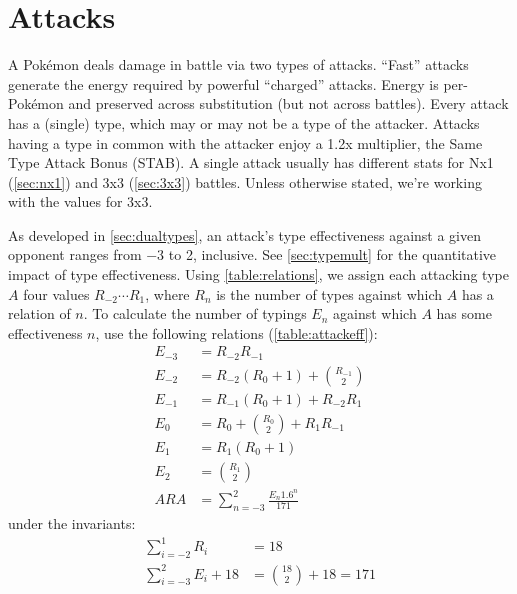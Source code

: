 \chapter{Attacks\label{chap:attacks}}
A Pokémon deals damage in battle via two types of attacks.
``Fast'' attacks generate the energy required by powerful ``charged'' attacks.
Energy is per-Pokémon and preserved across substitution (but not across battles).
Every attack has a (single) type, which may or may not be a type of the attacker.
Attacks having a type in common with the attacker enjoy a 1.2x multiplier, the Same Type Attack Bonus (STAB).
A single attack usually has different stats for Nx1 (\autoref{sec:nx1})
  and 3x3 (\autoref{sec:3x3}) battles.
Unless otherwise stated, we're working with the values for 3x3.

As developed in \autoref{sec:dualtypes}, an attack's type effectiveness
  against a given opponent ranges from −3 to 2, inclusive.
See \autoref{sec:typemult} for the quantitative impact of type effectiveness.
Using \autoref{table:relations}, we assign each attacking type $A$ four values
  $R_{-2}\cdots{}R_1$, where $R_n$ is the number of types against which $A$ has a
  relation of $n$.
To calculate the number of typings $E_n$ against which $A$ has some effectiveness $n$,
  use the following relations (\autoref{table:attackeff}):
\begin{align*}
  E_{−3} &= R_{−2}R_{−1}\\
  E_{−2} &= R_{−2}(R_0 + 1) + \binom{R_{−1}}{2}\\
  E_{−1} &= R_{−1}(R_0 + 1) + R_{−2}R_1\\
   E_{0} &= R_0 + \binom{R_0}{2} + R_{1}R_{−1}\\
   E_{1} &= R_{1}(R_0 + 1)\\
   E_{2} &= \binom{R_1}{2}\\
   ARA &= \sum_{n=-3}^{2} \frac{E_{n}1.6^n}{171}
\end{align*}
under the invariants:
\begin{align*}
    \sum_{i=−2}^{1} R_i &= 18\\
   \sum_{i=−3}^{2} E_i + 18 &= \binom{18}{2} + 18  = 171
\end{align*}
